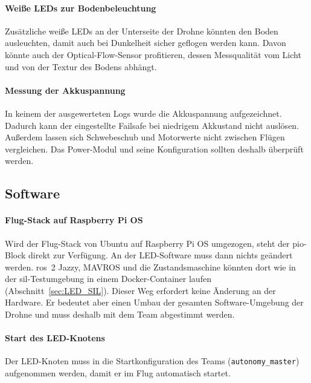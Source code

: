     \paragraph{Weiße LEDs zur Bodenbeleuchtung}
    Zusätzliche weiße LEDs an der Unterseite der Drohne könnten den Boden ausleuchten, damit auch bei Dunkelheit sicher
    geflogen werden kann.
    Davon könnte auch der Optical-Flow-Sensor profitieren, dessen Messqualität vom Licht und von der Textur des Bodens
    abhängt.

    \paragraph{Messung der Akkuspannung}
    In keinem der ausgewerteten Logs wurde die Akkuspannung aufgezeichnet.
    Dadurch kann der eingestellte Failsafe bei niedrigem Akkustand nicht auslösen.
    Außerdem lassen sich Schwebeschub und Motorwerte nicht zwischen Flügen vergleichen.
    Das Power-Modul und seine Konfiguration sollten deshalb überprüft werden.

    \subsection{Software}
    \label{sec:Ausblick_Software}

    \paragraph{Flug-Stack auf Raspberry Pi OS}
    Wird der Flug-Stack von Ubuntu auf Raspberry Pi OS umgezogen, steht der \gls{pio}-Block direkt zur Verfügung.
    An der LED-Software muss dann nichts geändert werden.
    \gls{ros}~2 Jazzy, MAVROS und die Zustandsmaschine könnten dort wie in der \gls{sil}-Testumgebung in einem
    Docker-Container laufen (Abschnitt~\ref{sec:LED_SIL}).
    Dieser Weg erfordert keine Änderung an der Hardware.
    Er bedeutet aber einen Umbau der gesamten Software-Umgebung der Drohne und muss deshalb mit dem Team abgestimmt
    werden.

    \paragraph{Start des LED-Knotens}
    Der LED-Knoten muss in die Startkonfiguration des Teams (\texttt{autonomy\_master}) aufgenommen werden, damit er im
    Flug automatisch startet.

